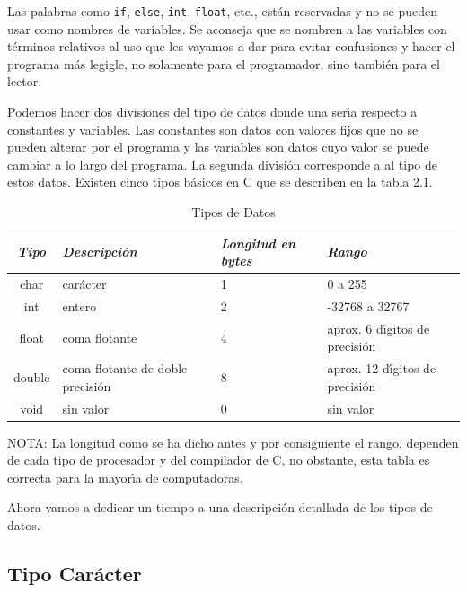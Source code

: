 Las palabras como \texttt{if}, \texttt{else}, \texttt{int}, \texttt{float}, 
etc., est\'an reservadas y no se pueden usar como nombres de variables.
Se aconseja que se nombren a las variables con t\'erminos relativos al
uso que les vayamos a dar  para evitar confusiones y hacer el programa
m\'as legigle, no solamente para el programador, sino tambi\'en para el lector.

Podemos hacer dos divisiones del tipo de datos donde una ser\'{\i}a respecto
a constantes y variables. Las constantes son datos con valores fijos que
no se pueden alterar por el programa y las variables son datos cuyo valor se
puede cambiar a lo largo del programa. La segunda divisi\'on corresponde a 
al tipo de estos datos. Existen cinco tipos b\'asicos en C que se describen
en la tabla 2.1.

\begin{table}[!hbp]
\begin{tabular}{|c|p{1in}|p{0.5in}|p{1.5in}|} \hline
\em Tipo & \em Descripci\'on & \em Longitud en bytes & \em Rango \\ \hline
\hline 
char & car\'acter & 1 & 0 a 255\\ \hline
int & entero & 2 & -32768 a 32767\\ \hline
float & coma flotante & 4 & aprox. 6 d\'{\i}gitos de precisi\'on\\ \hline
double & coma flotante de doble precisi\'on & 8 & aprox. 12 d\'{\i}gitos
de precisi\'on\\ \hline
void & sin valor & 0 & sin valor\\ \hline
\end{tabular}
\caption{Tipos de Datos}
\end{table}

\begin{description}

\item NOTA: La longitud como se ha dicho antes y por consiguiente el
rango, dependen
de cada tipo de procesador y del compilador de C, no obstante, esta tabla es
correcta para la mayor\'{\i}a  de computadoras.
\end{description}

Ahora vamos a dedicar un tiempo a una descripci\'on detallada de los tipos de 
datos.

\subsection{Tipo Car\'acter}

